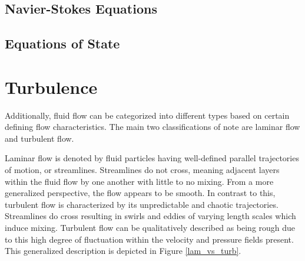 \subsection{Navier-Stokes Equations}
\subsection{Equations of State}

\section{Turbulence}
Additionally, fluid flow can be categorized into different types based on certain defining flow characteristics. The main two classifications of note are laminar flow and turbulent flow.

Laminar flow is denoted by fluid particles having well-defined parallel trajectories of motion, or streamlines. Streamlines do not cross, meaning adjacent layers within the fluid flow by one another with little to no mixing. From a more generalized perspective, the flow appears to be smooth. In contrast to this, turbulent flow is characterized by its unpredictable and chaotic trajectories. Streamlines do cross resulting in swirls and eddies of varying length scales which induce mixing. Turbulent flow can be qualitatively described as being rough due to this high degree of fluctuation within the velocity and pressure fields present. This generalized description is depicted in Figure \ref{lam_vs_turb}.

